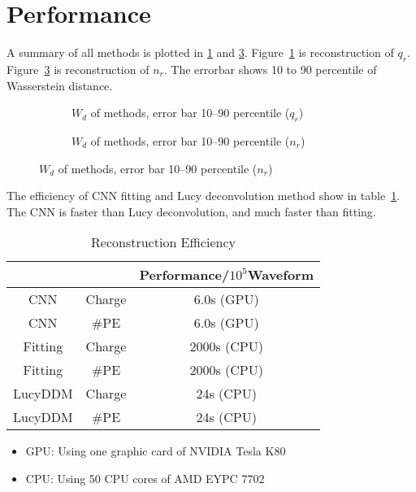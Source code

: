 \section{Performance} %
A summary of all methods is plotted in \ref{fig:chargesummary} and \ref{fig:penumsummary}. Figure~\ref{fig:chargesummary} is reconstruction of $q_{r}$. Figure~\ref{fig:penumsummary} is reconstruction of $n_{r}$. The errorbar shows 10 to 90 percentile of Wasserstein distance. 

\begin{figure}[H]
    \begin{subfigure}{0.5\textwidth}
        \centering
        \scalebox{0.4}{}
        \caption{\label{fig:chargesummary} $W_{d}$ of methods, error bar 10--90 percentile ($q_{r}$)}
    \end{subfigure}
    \begin{subfigure}{0.5\textwidth}
        \centering
        \scalebox{0.4}{}
        \caption{\label{fig:penumsummary} $W_{d}$ of methods, error bar 10--90 percentile ($n_{r}$)}
    \end{subfigure}
\end{figure}

The efficiency of CNN fitting and Lucy deconvolution method show in table~\ref{fig:efficiency}. The CNN is faster than Lucy deconvolution, and much faster than fitting. 

\begin{table}[H]
    \centering
    \caption{\label{fig:efficiency} Reconstruction Efficiency}
    \begin{tabular}{c|c|c}
        \hline
        & & Performance/$10^{5}$Waveform \\
        \hline
        CNN & Charge & 6.0s (GPU) \\
        \hline
        CNN & \#PE & 6.0s (GPU)\\
        \hline
        Fitting & Charge & 2000s (CPU) \\
        \hline
        Fitting & \#PE & 2000s (CPU) \\
        \hline
        LucyDDM & Charge & 24s (CPU) \\
        \hline
        LucyDDM & \#PE & 24s (CPU) \\
        \hline
    \end{tabular}
\end{table}
\hspace{4mm}
\begin{center}
\begin{itemize}
    \item GPU: Using one graphic card of NVIDIA Tesla K80
    \item CPU: Using 50 CPU cores of AMD EYPC 7702
\end{itemize}
\end{center}

